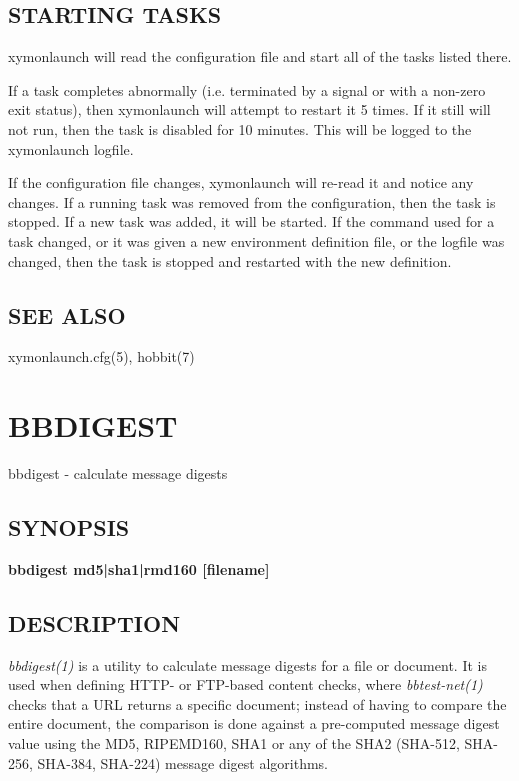 \subsection{STARTING TASKS}  xymonlaunch will read the configuration
 file and start all of the tasks listed there. 


  If a task completes abnormally (i.e. terminated by a signal or with
  a non-zero exit status), then xymonlaunch will attempt to restart
  it 5 times. If it still will not run, then the task is disabled for
  10 minutes. This will be logged to the xymonlaunch logfile. 


  If the configuration file changes, xymonlaunch will re-read it and
  notice any changes. If a running task was removed from the
  configuration, then the task is stopped. If a new task was added, it
  will be started. If the command used for a task changed, or it was
  given a new environment definition file, or the logfile was changed,
  then the task is stopped and restarted with the new definition. 



 
\subsection{SEE ALSO}
xymonlaunch.cfg(5), hobbit(7) 

 


%
%
\newpage
\section{BBDIGEST}
 bbdigest - calculate message digests

\subsection{SYNOPSIS}
\textbf{bbdigest md5|sha1|rmd160 [filename]}


 
\subsection{DESCRIPTION}
\emph{bbdigest(1)}
 is a utility to calculate message digests for a file or document. It
 is used when defining HTTP- or FTP-based content checks, where
 \emph{bbtest-net(1)} checks that a URL returns a specific document;
 instead of having to compare the entire document, the comparison is
 done against a pre-computed message digest value using the MD5,
 RIPEMD160, SHA1 or any of the SHA2 (SHA-512, SHA-256, SHA-384,
 SHA-224) message digest algorithms. 


